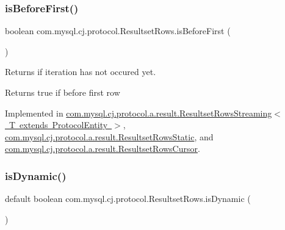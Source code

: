\mbox{\label{interfacecom_1_1mysql_1_1cj_1_1protocol_1_1_resultset_rows_a748205e182d8b1b1263ebe78c7062517}} 
\subsubsection{\texorpdfstring{is\+Before\+First()}{isBeforeFirst()}}
{\footnotesize\ttfamily boolean com.\+mysql.\+cj.\+protocol.\+Resultset\+Rows.\+is\+Before\+First (\begin{DoxyParamCaption}{ }\end{DoxyParamCaption})}

Returns if iteration has not occured yet.

\begin{DoxyReturn}{Returns}
true if before first row 
\end{DoxyReturn}


Implemented in \mbox{\hyperlink{classcom_1_1mysql_1_1cj_1_1protocol_1_1a_1_1result_1_1_resultset_rows_streaming_aea0a6d7632abca3ff7a6f6d69412c011}{com.\+mysql.\+cj.\+protocol.\+a.\+result.\+Resultset\+Rows\+Streaming$<$ T extends Protocol\+Entity $>$}}, \mbox{\hyperlink{classcom_1_1mysql_1_1cj_1_1protocol_1_1a_1_1result_1_1_resultset_rows_static_adbab4e5b2490a9e147a79de4cc7d6e1d}{com.\+mysql.\+cj.\+protocol.\+a.\+result.\+Resultset\+Rows\+Static}}, and \mbox{\hyperlink{classcom_1_1mysql_1_1cj_1_1protocol_1_1a_1_1result_1_1_resultset_rows_cursor_a6ca4bec845f7589a9182c52c8f81e0c2}{com.\+mysql.\+cj.\+protocol.\+a.\+result.\+Resultset\+Rows\+Cursor}}.

\mbox{\label{interfacecom_1_1mysql_1_1cj_1_1protocol_1_1_resultset_rows_aa9dd39e935202eca58365a9f0c166db8}} 
\subsubsection{\texorpdfstring{is\+Dynamic()}{isDynamic()}}
{\footnotesize\ttfamily default boolean com.\+mysql.\+cj.\+protocol.\+Resultset\+Rows.\+is\+Dynamic (\begin{DoxyParamCaption}{ }\end{DoxyParamCaption})}

